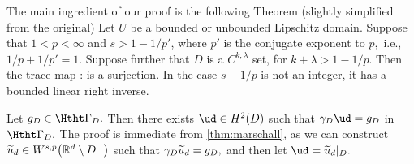 The main ingredient of our proof is the following Theorem (slightly simplified from the original)
\bth[\cite{Ma:87}]\label{thm:marschall}
Let $U$ be a bounded or unbounded Lipschitz domain. Suppose that $1<p<\infty$ and $s > 1- 1/p'$, where $p'$ is the conjugate exponent to $p,$ i.e., $1/p + 1/p' = 1.$ Suppose further that $D$ is a $C^{k,\lambda}$ set, for $k+\lambda > 1-1/p.$ Then the trace map
\beqs
\gamma : \WspU \rightarrow \WsmoppdU
\eeqs
is a surjection. In the case $s- 1/p$ is not an integer, it has a bounded linear right inverse.
\enth

\ble[Existence of $\ud$]\label{lem:ud}
Let $\gD \in \HthtGD.$ Then there exists $\ud \in \HtD$ such that $\trGD \ud = \gD$ in $\HthtGD.$
\ele
{}
The proof is immediate from \cref{thm:marschall}, as we can construct  $\udtilde \in \WspRRdsmDm$ such that $\gamma_{D} \widetilde{u}_{d} = g_{D},$ and then let $\ud = \udtilde\restrict{D}.$
\epf